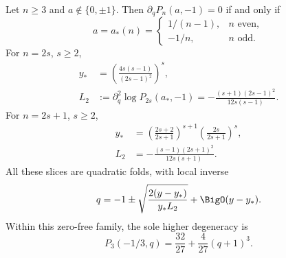 \begin{theorem}[Complete zero-free criticality at \(q=-1\)]
\label{fp-minus-one-criticality}
Let \(n\geq3\) and \(a\notin\{0,\pm1\}\).  Then
\(\partial_qP_n(a,-1)=0\) if and only if
\begin{equation}
 a=a_*(n)=
 \begin{cases}
  1/(n-1),&n\text{ even},\\
  -1/n,&n\text{ odd}.
 \end{cases}
 \label{fp-minus-one-parameter}
\end{equation}
For \(n=2s\), \(s\geq2\),
\begin{align}
 y_*&=\left(\frac{4s(s-1)}{(2s-1)^2}\right)^s,
 \label{fp-minus-one-even-value}\\
 L_2&:=\partial_q^2\log P_{2s}(a_*,-1)
 =-\frac{(s+1)(2s-1)^2}{12s(s-1)}.
 \label{fp-minus-one-even-second}
\end{align}
For \(n=2s+1\), \(s\geq2\),
\begin{align}
 y_*&=\left(\frac{2s+2}{2s+1}\right)^{s+1}
      \left(\frac{2s}{2s+1}\right)^s,
 \label{fp-minus-one-odd-value}\\
 L_2&=-\frac{(s-1)(2s+1)^2}{12s(s+1)}.
 \label{fp-minus-one-odd-second}
\end{align}
All these slices are quadratic folds, with local inverse
\begin{equation}
 q=-1\pm\sqrt{\frac{2(y-y_*)}{y_*L_2}}+\BigO(y-y_*).
 \label{fp-minus-one-fold}
\end{equation}
Within this zero-free family, the sole higher degeneracy is
\begin{equation}
 P_3(-1/3,q)=\frac{32}{27}+\frac4{27}(q+1)^3.
 \label{fp-minus-one-cubic}
\end{equation}
\end{theorem}


